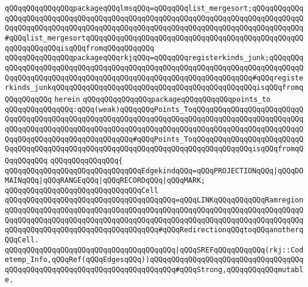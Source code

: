 \verb|qQQqqQQqqQQqqQQqpackageqQQqlmsqQQq=qQQqqQQqlist_mergesort;qQQqqQQqqQQqqQQqqQQqqQQqqQQqqQQqqQQqqQQqqQQqqQQqqQQqqQQqqQQqqQQqqQQqqQQqqQQqqQQqqQQqqQQqqQQqqQQqqQQqqQQqqQQqqQQqqQQqqQQqqQQqqQQqqQQqqQQqqQQqqQQqqQQqqQQq#qQQqlist_mergesortqQQqqQQqqQQqqQQqqQQqqQQqqQQqqQQqqQQqqQQqqQQqqQQqqQQqqQQqqQQqqQQqisqQQqfromqQQqqQQqqQQq|\newline
\verb|qQQqqQQqqQQqqQQqpackageqQQqrkjqQQq=qQQqqQQqregisterkinds_junk;qQQqqQQqqQQqqQQqqQQqqQQqqQQqqQQqqQQqqQQqqQQqqQQqqQQqqQQqqQQqqQQqqQQqqQQqqQQqqQQqqQQqqQQqqQQqqQQqqQQqqQQqqQQqqQQqqQQqqQQqqQQqqQQqqQQqqQQq#qQQqregisterkinds_junkqQQqqQQqqQQqqQQqqQQqqQQqqQQqqQQqqQQqqQQqqQQqqQQqisqQQqfromqQQqqQQqqQQq|\newline
\verb|herein|\newline
\newline
\verb|qQQqqQQqqQQqqQQqpackageqQQqqQQqqQQqpoints_to|\newline
\verb|qQQqqQQqqQQqqQQq:qQQq(weak)qQQqqQQqPoints_ToqQQqqQQqqQQqqQQqqQQqqQQqqQQqqQQqqQQqqQQqqQQqqQQqqQQqqQQqqQQqqQQqqQQqqQQqqQQqqQQqqQQqqQQqqQQqqQQqqQQqqQQqqQQqqQQqqQQqqQQqqQQqqQQqqQQqqQQqqQQqqQQqqQQqqQQqqQQqqQQqqQQqqQQqqQQqqQQqqQQqqQQqqQQqqQQqqQQq#qQQqPoints_ToqQQqqQQqqQQqqQQqqQQqqQQqqQQqqQQqqQQqqQQqqQQqqQQqqQQqqQQqqQQqqQQqqQQqqQQqqQQqqQQqqQQqisqQQqfromqQQqqQQqqQQq|\newline
\verb|qQQqqQQqqQQqqQQq{|\newline
\verb|qQQqqQQqqQQqqQQqqQQqqQQqqQQqqQQqEdgekindqQQq=qQQqPROJECTIONqQQq|\verb#|qQQqDOMAINqQQq|qQQqRANGEqQQq|qQQqRECORDqQQq|qQQqMARK;#\newline
\newline
\verb|qQQqqQQqqQQqqQQqqQQqqQQqqQQqqQQqCell|\newline
\verb|qQQqqQQqqQQqqQQqqQQqqQQqqQQqqQQqqQQqqQQq=qQQqLINKqQQqqQQqqQQqRamregionqQQqqQQqqQQqqQQqqQQqqQQqqQQqqQQqqQQqqQQqqQQqqQQqqQQqqQQqqQQqqQQqqQQqqQQqqQQqqQQqqQQqqQQqqQQqqQQqqQQqqQQqqQQqqQQqqQQqqQQqqQQqqQQqqQQqqQQqqQQqqQQqqQQqqQQqqQQqqQQqqQQqqQQqqQQqqQQq#qQQqRedirectionqQQqtoqQQqanotherqQQqCell.|\newline
\verb|qQQqqQQqqQQqqQQqqQQqqQQqqQQqqQQqqQQqqQQq|\verb#|qQQqSREFqQQqqQQqqQQq(rkj::Codetemp_Info,qQQqRef(qQQqEdgesqQQq))qQQqqQQqqQQqqQQqqQQqqQQqqQQqqQQqqQQqqQQqqQQqqQQqqQQqqQQqqQQqqQQqqQQqqQQqqQQq#\verb|#qQQqStrong,qQQqqQQqqQQqmutable.|\newline
